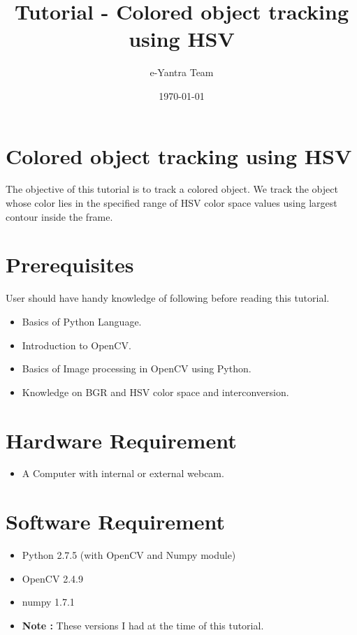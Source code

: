 \documentclass[11pt,a4paper]{article}
\title{Tutorial - Colored object tracking using HSV}
\author{e-Yantra Team}
\date{\today}
\begin{document}
	\maketitle
	\newpage
	\tableofcontents
	\newpage
	\section{Colored object tracking using HSV}
	The objective of this tutorial is to track a colored object. We track the object whose color lies in the specified range of HSV color space values using largest contour inside the frame.
	\section{Prerequisites}
	User should have handy knowledge of following before reading this tutorial.
	\begin{itemize}
		\item Basics of Python Language.
		\item Introduction to OpenCV.
		\item Basics of Image processing in OpenCV using Python.
		\item Knowledge on BGR and HSV color space and interconversion.
	\end{itemize}
	\section{Hardware Requirement}
	\begin{itemize}
		\item A Computer with internal or external webcam.
	\end{itemize}
	\section{Software Requirement}
	\begin{itemize}
		\item Python 2.7.5 (with OpenCV and Numpy module)
		\item OpenCV 2.4.9 
		\item numpy 1.7.1
		\item \textbf{Note :} These versions I had at the time of this tutorial.
	\end{itemize}
\end{document}
